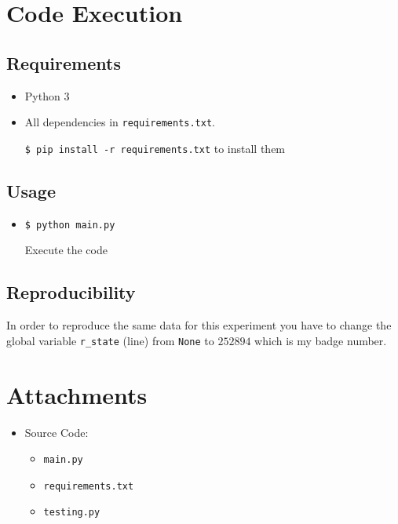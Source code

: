 \documentclass[a4paper, 11pt]{article}
\begin{document}
	\section{Code Execution}
	\subsection{Requirements}
	\begin{itemize}
		\item Python 3
		\item All dependencies in \texttt{requirements.txt}.
		
		\texttt{\$ pip install -r requirements.txt} to install them
	\end{itemize}
	\subsection{Usage}
	\begin{itemize}
		\item \texttt{\$ python main.py}
		
		Execute the code
		
	\end{itemize}
	\subsection{Reproducibility}
	In order to reproduce the same data for this experiment you have to change the global variable \texttt{r\_state} (line) from \texttt{None} to $252894$ which is my badge number.

	\section*{Attachments}
	\begin{itemize}
		\item Source Code:
		\begin{itemize}
			\item \texttt{main.py}
			\item \texttt{requirements.txt}
			\item \texttt{testing.py}
		\end{itemize}
	\end{itemize}
	
	
	
	
\end{document}
